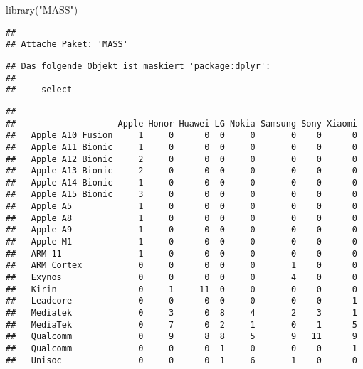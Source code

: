 \documentclass[
]{article}
\newenvironment{Shaded}{\begin{snugshade}}{\end{snugshade}}
\newcommand{\CommentTok}[1]{\textcolor[rgb]{0.56,0.35,0.01}{\textit{#1}}}
\newcommand{\FunctionTok}[1]{\textcolor[rgb]{0.00,0.00,0.00}{#1}}
\newcommand{\NormalTok}[1]{#1}
\newcommand{\OtherTok}[1]{\textcolor[rgb]{0.56,0.35,0.01}{#1}}
\newcommand{\SpecialCharTok}[1]{\textcolor[rgb]{0.00,0.00,0.00}{#1}}
\newcommand{\StringTok}[1]{\textcolor[rgb]{0.31,0.60,0.02}{#1}}
\begin{document}
\begin{Shaded}
\begin{Highlighting}[]
\FunctionTok{library}\NormalTok{(}\StringTok{"MASS"}\NormalTok{)}
\end{Highlighting}
\end{Shaded}

\begin{verbatim}
## 
## Attache Paket: 'MASS'
\end{verbatim}

\begin{verbatim}
## Das folgende Objekt ist maskiert 'package:dplyr':
## 
##     select
\end{verbatim}

\begin{Shaded}
\end{Shaded}

\begin{verbatim}
##                   
##                    Apple Honor Huawei LG Nokia Samsung Sony Xiaomi
##   Apple A10 Fusion     1     0      0  0     0       0    0      0
##   Apple A11 Bionic     1     0      0  0     0       0    0      0
##   Apple A12 Bionic     2     0      0  0     0       0    0      0
##   Apple A13 Bionic     2     0      0  0     0       0    0      0
##   Apple A14 Bionic     1     0      0  0     0       0    0      0
##   Apple A15 Bionic     3     0      0  0     0       0    0      0
##   Apple A5             1     0      0  0     0       0    0      0
##   Apple A8             1     0      0  0     0       0    0      0
##   Apple A9             1     0      0  0     0       0    0      0
##   Apple M1             1     0      0  0     0       0    0      0
##   ARM 11               1     0      0  0     0       0    0      0
##   ARM Cortex           0     0      0  0     0       1    0      0
##   Exynos               0     0      0  0     0       4    0      0
##   Kirin                0     1     11  0     0       0    0      0
##   Leadcore             0     0      0  0     0       0    0      1
##   Mediatek             0     3      0  8     4       2    3      1
##   MediaTek             0     7      0  2     1       0    1      5
##   Qualcomm             0     9      8  8     5       9   11      9
##   Qualcomm             0     0      0  1     0       0    0      1
##   Unisoc               0     0      0  1     6       1    0      0
\end{verbatim}
\end{document}
